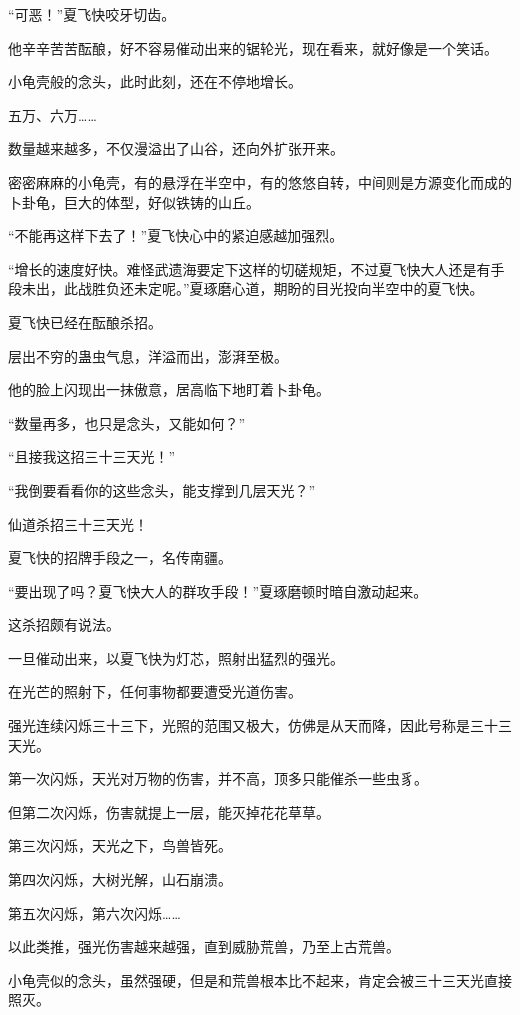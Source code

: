 
\begin{this_body}

“可恶！”夏飞快咬牙切齿。

他辛辛苦苦酝酿，好不容易催动出来的锯轮光，现在看来，就好像是一个笑话。

小龟壳般的念头，此时此刻，还在不停地增长。

五万、六万……

数量越来越多，不仅漫溢出了山谷，还向外扩张开来。

密密麻麻的小龟壳，有的悬浮在半空中，有的悠悠自转，中间则是方源变化而成的卜卦龟，巨大的体型，好似铁铸的山丘。

“不能再这样下去了！”夏飞快心中的紧迫感越加强烈。

“增长的速度好快。难怪武遗海要定下这样的切磋规矩，不过夏飞快大人还是有手段未出，此战胜负还未定呢。”夏琢磨心道，期盼的目光投向半空中的夏飞快。

夏飞快已经在酝酿杀招。

层出不穷的蛊虫气息，洋溢而出，澎湃至极。

他的脸上闪现出一抹傲意，居高临下地盯着卜卦龟。

“数量再多，也只是念头，又能如何？”

“且接我这招三十三天光！”

“我倒要看看你的这些念头，能支撑到几层天光？”

仙道杀招三十三天光！

夏飞快的招牌手段之一，名传南疆。

“要出现了吗？夏飞快大人的群攻手段！”夏琢磨顿时暗自激动起来。

这杀招颇有说法。

一旦催动出来，以夏飞快为灯芯，照射出猛烈的强光。

在光芒的照射下，任何事物都要遭受光道伤害。

强光连续闪烁三十三下，光照的范围又极大，仿佛是从天而降，因此号称是三十三天光。

第一次闪烁，天光对万物的伤害，并不高，顶多只能催杀一些虫豸。

但第二次闪烁，伤害就提上一层，能灭掉花花草草。

第三次闪烁，天光之下，鸟兽皆死。

第四次闪烁，大树光解，山石崩溃。

第五次闪烁，第六次闪烁……

以此类推，强光伤害越来越强，直到威胁荒兽，乃至上古荒兽。

小龟壳似的念头，虽然强硬，但是和荒兽根本比不起来，肯定会被三十三天光直接照灭。


\end{this_body}
